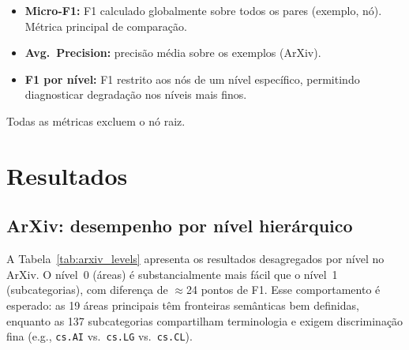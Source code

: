 \documentclass[11pt,a4paper,twoside]{article}
\begin{document}
\begin{itemize}[leftmargin=*, itemsep=1pt]
  \item \textbf{Micro-F1:} F1 calculado globalmente sobre todos os pares
        (exemplo, nó). Métrica principal de comparação.
  \item \textbf{Avg.\ Precision:} precisão média sobre os exemplos (ArXiv).
  \item \textbf{F1 por nível:} F1 restrito aos nós de um nível específico,
        permitindo diagnosticar degradação nos níveis mais finos.
\end{itemize}

Todas as métricas excluem o nó raiz.

\section{Resultados}
\label{sec:results}

\subsection{ArXiv: desempenho por nível hierárquico}

A Tabela~\ref{tab:arxiv_levels} apresenta os resultados desagregados por nível
no ArXiv. O nível~0 (áreas) é substancialmente mais fácil que o nível~1
(subcategorias), com diferença de $\approx$24 pontos de F1. Esse comportamento é
esperado: as 19 áreas principais têm fronteiras semânticas bem definidas,
enquanto as 137 subcategorias compartilham terminologia e exigem discriminação
fina (e.g., \texttt{cs.AI} vs.\ \texttt{cs.LG} vs.\ \texttt{cs.CL}).
\end{document}
